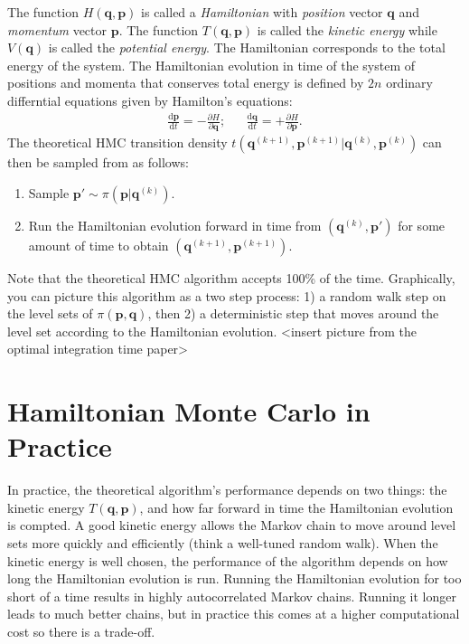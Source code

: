 \documentclass{article}
\begin{document}
The function $H(\bm{q}, \bm{p})$ is called a \emph{Hamiltonian} with \emph{position} vector $\bm{q}$ and \emph{momentum} vector $\bm{p}$. The function $T(\bm{q}, \bm{p})$ is called the \emph{kinetic energy} while $V(\bm{q})$ is called the \emph{potential energy}. The Hamiltonian corresponds to the total energy of the system. The Hamiltonian evolution in time of the system of positions and momenta that conserves total energy is defined by $2n$ ordinary differntial equations given by Hamilton's equations:
\begin{align*}
\frac{\mathrm{d}\bm{p}}{\mathrm{d} t} = - \frac{\partial H}{\partial \bm{q}}; && \frac{\mathrm{d}\bm{q}}{\mathrm{d} t} = + \frac{\partial H}{\partial \bm{p}}.
\end{align*}
The theoretical HMC transition density $t(\bm{q}^{(k+1)}, \bm{p}^{(k+1)}| \bm{q}^{(k)}, \bm{p}^{(k)})$ can then be sampled from as follows:
\begin{enumerate}
\item Sample $\bm{p}' \sim \pi(\bm{p}|\bm{q}^{(k)})$.
\item Run the Hamiltonian evolution forward in time from $(\bm{q}^{(k)}, \bm{p}')$ for some amount of time to obtain $(\bm{q}^{(k+1)}, \bm{p}^{(k+1)})$.
\end{enumerate}
Note that the theoretical HMC algorithm accepts 100\% of the time. Graphically, you can picture this algorithm as a two step process: 1) a random walk step on the level sets of $\pi(\bm{p}, \bm{q})$, then 2) a deterministic step that moves around the level set according to the Hamiltonian evolution. <insert picture from the optimal integration time paper>

\section{Hamiltonian Monte Carlo in Practice}
In practice, the theoretical algorithm's performance depends on two things: the kinetic energy $T(\bm{q}, \bm{p})$, and how far forward in time the Hamiltonian evolution is compted. A good kinetic energy allows the Markov chain to move around level sets more quickly and efficiently (think a well-tuned random walk). When the kinetic energy is well chosen, the performance of the algorithm depends on how long the Hamiltonian evolution is run. Running the Hamiltonian evolution for too short of a time results in highly autocorrelated Markov chains. Running it longer leads to much better chains, but in practice this comes at a higher computational cost so there is a trade-off.
\end{document}
